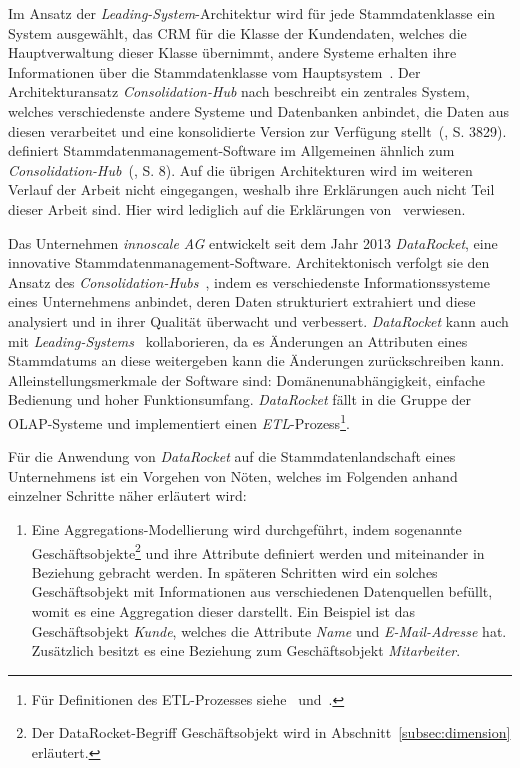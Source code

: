\documentclass[
  language=german, %
  type=bachelor,%
  ngerman
]{isthesis}
\begin{document}
\begin{content}
  Im Ansatz der \textit{Leading-System}-Architektur wird für jede
  Stammdatenklasse ein System ausgewählt, \zB{} das \acrshort{CRM} für die
  Klasse der Kundendaten, welches die Hauptverwaltung dieser Klasse übernimmt,
  andere Systeme erhalten ihre Informationen über die Stammdatenklasse vom
  Hauptsystem~\cite[][S. 3829]{baghi2014toward}. Der Architekturansatz
  \textit{Consolidation-Hub} nach \textsc{\citeauthor{baghi2014toward}}
  beschreibt ein zentrales System, welches verschiedenste andere Systeme und
  Datenbanken anbindet, die Daten aus diesen verarbeitet und eine konsolidierte
  Version zur Verfügung stellt~(\citeyear{baghi2014toward}, S. 3829).
  \textsc{\citeauthor{loshin2010master}} definiert Stammdatenmanagement-Software
  im Allgemeinen ähnlich zum
  \textit{Consolidation-Hub}~(\citeyear{loshin2010master}, S. 8). Auf die
  übrigen Architekturen wird im weiteren Verlauf der Arbeit nicht eingegangen,
  weshalb ihre Erklärungen auch nicht Teil dieser Arbeit sind. Hier wird
  lediglich auf die Erklärungen von~\textsc{\citeauthor{baghi2014toward}}
  \citeyearpar{baghi2014toward} verwiesen.

	Das Unternehmen \textit{innoscale AG} entwickelt seit dem Jahr 2013
	\textit{DataRocket}, eine innovative Stammdatenmanagement-Software.
	Architektonisch verfolgt sie den Ansatz des
	\textit{Consolidation-Hubs}~\cite[][]{baghi2014toward}, indem es
	verschiedenste Informationssysteme eines Unternehmens anbindet, deren Daten
	strukturiert extrahiert und diese analysiert und in ihrer Qualität überwacht
	und verbessert. \textit{DataRocket} kann auch mit
	\textit{Leading-Systems}~\cite[][]{baghi2014toward} kollaborieren, da es
	Änderungen an Attributen eines Stammdatums an diese weitergeben kann \bzw{}
	die Änderungen zurückschreiben kann.  Alleinstellungsmerkmale der Software
	sind: Domänenunabhängigkeit, einfache Bedienung und hoher
	Funktionsumfang.
	\textit{DataRocket} fällt in die Gruppe der \acrshort{OLAP}-Systeme und
	implementiert einen \textit{\acrlong{ETL}}-Prozess\footnote{Für Definitionen
	des ETL-Prozesses siehe~\textsc{\citeauthor{vassiliadis2002conceptual}}
	\citeyearpar{vassiliadis2002conceptual}
	und~\textsc{\citeauthor{trujillo2003uml}}.}.

  Für die Anwendung von \textit{DataRocket} auf die Stammdatenlandschaft eines
  Unternehmens ist ein Vorgehen von Nöten, welches im Folgenden anhand
  einzelner Schritte näher erläutert wird:

	\begin{enumerate}
		\item Eine Aggregations-Modellierung wird durchgeführt, indem sogenannte
		Geschäftsobjekte\footnote{Der DataRocket-Begriff Geschäftsobjekt wird in
		Abschnitt~\ref{subsec:dimension} erläutert.} und ihre Attribute definiert
		werden und miteinander in Beziehung gebracht werden. In späteren Schritten
		wird ein solches Geschäftsobjekt mit Informationen aus verschiedenen
		Datenquellen befüllt, womit es eine Aggregation dieser darstellt. Ein
		Beispiel ist das Geschäftsobjekt \textit{Kunde}, welches die Attribute
		\textit{Name} und \textit{E-Mail-Adresse} hat. Zusätzlich besitzt es eine
		Beziehung zum Geschäftsobjekt \textit{Mitarbeiter}. 


\end{enumerate}
\end{content}
\end{document}

